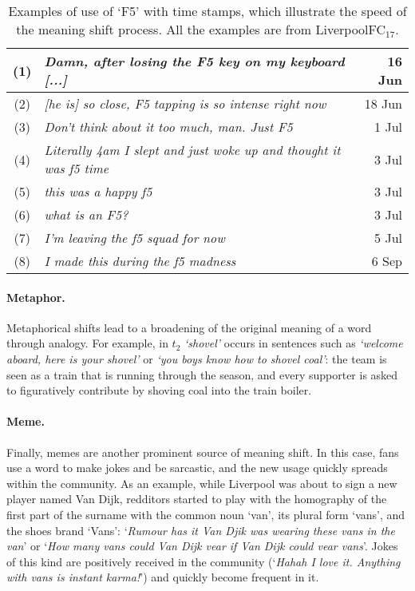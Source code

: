 \begin{table}[t]\centering
    \begin{tabular}{@{}c@{\ \ }p{5.5cm}r@{}}
        \hline
        (1) & \em Damn, after losing the F5 key on my keyboard [...] & 16 Jun\\\hline
        (2) & \em [he is] so  close, F5 tapping is so intense right now & 18 Jun\\\hline
        (3) & \em Don't think about it too much, man. Just F5 & 1 Jul\\\hline
        (4) & \em Literally 4am I slept and just woke up and thought it was f5 time & 3 Jul\\\hline
        (5) & \em this was a happy f5 & 3 Jul\\\hline
        (6) & \em what is an F5? & 3 Jul \\\hline
        (7) & \em I'm leaving the f5 squad for now & 5 Jul\\\hline
        (8) & \em I made this during the f5 madness & 6 Sep\\\hline      
    \end{tabular}
    \caption{Examples of use of `F5' with time stamps, which illustrate the speed of the meaning shift process. All the examples are from LiverpoolFC$_{17}$.}
     \label{table:f5}
\end{table}

\paragraph{Metaphor.}
Metaphorical shifts lead to a broadening of the original meaning of a
word through analogy.
For example, in $t_2$ {\em `shovel'} occurs in sentences such as \textit{`welcome aboard, here is your shovel'} or 
\textit{`you boys know how to shovel coal'}: the team is seen as a train that is running through the season, and every supporter is asked to figuratively contribute by shoving coal into the train boiler. 

\paragraph{Meme.}
Finally, memes are another prominent source of meaning shift. 
In this case, fans use a word to make jokes and be sarcastic, and the new usage quickly spreads within the community. 
As an example, while Liverpool was about to sign a new player named Van Dijk, redditors started to play with the homography of the first part of the surname with the common noun `van', its plural form `vans', and the shoes brand `Vans': `\textit{Rumour has it Van Djik was wearing these vans in the van}' or `\textit{How many vans could Van Dijk vear if Van Dijk could vear vans}'. 
Jokes of this kind are positively received in the community (`\textit{Hahah I love it. Anything with vans is instant karma!}') and quickly become frequent in it.


